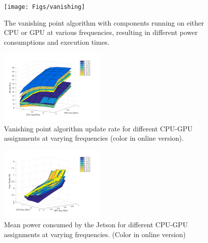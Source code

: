 \begin{figure}
	\centering
	\texttt{[image: Figs/vanishing]}
	\caption{The vanishing point algorithm with components running on either CPU or GPU at various frequencies, resulting in different power consumptions and execution times.}
	\label{fig:vanishing}		
\end{figure}

\begin{figure}[htbp]
	\centering
	\includegraphics[width=0.46\textwidth]{Figs/surf_Rate.pdf}
	\caption{Vanishing point algorithm update rate for different CPU-GPU assignments at varying frequencies (color in online version).}
	\label{fig:sfda}%
\end{figure}


\begin{figure}[htbp]
	\centering
	\includegraphics[width=0.46\textwidth]{Figs/surf_Power.pdf}
	\caption{Mean power consumed by the Jetson for different CPU-GPU assignments at varying frequencies. (Color in online version)}
	\label{fig:sfda_pow}%
\end{figure}
